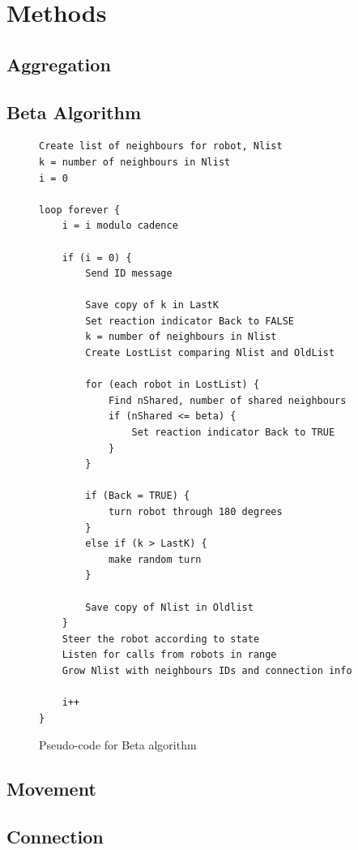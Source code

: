 \section{Methods}



\subsection{Aggregation}



\subsection{Beta Algorithm}
\begin{figure}[H]
\caption{Pseudo-code for Beta algorithm \cite{Nembrini2002}}
\begin{lstlisting}[style=code]
Create list of neighbours for robot, Nlist
k = number of neighbours in Nlist
i = 0

loop forever {
	i = i modulo cadence

	if (i = 0) {
		Send ID message

		Save copy of k in LastK
		Set reaction indicator Back to FALSE
		k = number of neighbours in Nlist
		Create LostList comparing Nlist and OldList

		for (each robot in LostList) {
			Find nShared, number of shared neighbours
			if (nShared <= beta) {
				Set reaction indicator Back to TRUE
			}
		}

		if (Back = TRUE) {
			turn robot through 180 degrees
		}
		else if (k > LastK) {
			make random turn
		}
		
		Save copy of Nlist in Oldlist
	}
	Steer the robot according to state
	Listen for calls from robots in range
	Grow Nlist with neighbours IDs and connection info

	i++
}
\end{lstlisting}
\label{fig:pseudocode}
\end{figure}


\subsection{Movement}



\subsection{Connection}



